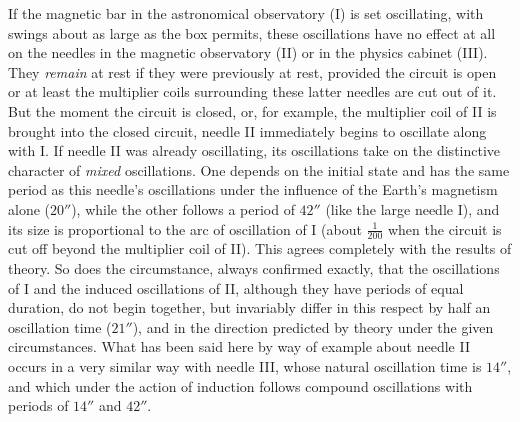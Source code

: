 If the magnetic bar in the astronomical observatory (I) is set oscillating, with swings about as large as the box permits, these oscillations have no effect at all on the needles in the magnetic observatory (II) or in the physics cabinet (III). They \textit{remain} at rest if they were previously at rest, provided the circuit is open or at least the multiplier coils surrounding these latter needles are cut out of it. But the moment the circuit is closed, or, for example, the multiplier coil of II is brought into the closed circuit, needle II immediately begins to oscillate along with I. If needle II was already oscillating, its oscillations take on the distinctive character of \textit{mixed} oscillations. One depends on the initial state and has the same period as this needle’s oscillations under the influence of the Earth’s magnetism alone ($20''$), while the other follows a period of $42''$ (like the large needle I), and its size is proportional to the arc of oscillation of I (about $\frac{1}{200}$ when the circuit is cut off beyond the multiplier coil of II). This agrees completely with the results of theory. So does the circumstance, always confirmed exactly, that the oscillations of I and the induced oscillations of II, although they have periods of equal duration, do not begin together, but invariably differ in this respect by half an oscillation time ($21''$), and in the direction predicted by theory under the given circumstances. What has been said here by way of example about needle II occurs in a very similar way with needle III, whose natural oscillation time is $14''$, and which under the action of induction follows compound oscillations with periods of $14''$ and $42''$.

